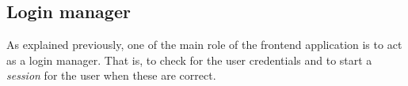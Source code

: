 \subsection{Login manager}
As explained previously, one of the main role of the frontend application is to act 
as a login manager. That is, to check for the user credentials and to start a 
\emph{session} for the user when these are correct.
